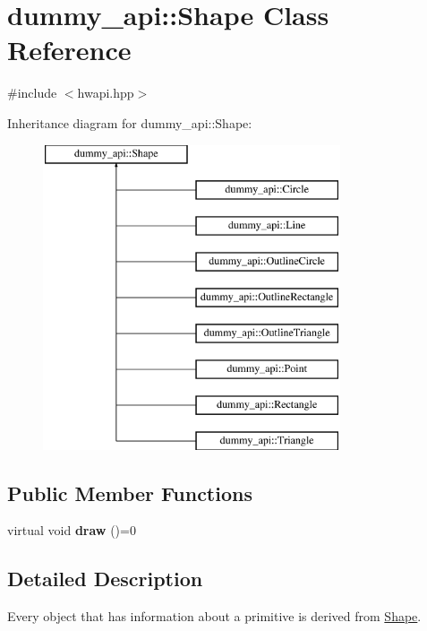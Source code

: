 \hypertarget{classdummy__api_1_1Shape}{}\section{dummy\+\_\+api\+:\+:Shape Class Reference}
\label{classdummy__api_1_1Shape}


{\ttfamily \#include $<$hwapi.\+hpp$>$}

Inheritance diagram for dummy\+\_\+api\+:\+:Shape\+:\begin{figure}[H]
\begin{center}
\leavevmode
\includegraphics[height=9.000000cm]{classdummy__api_1_1Shape}
\end{center}
\end{figure}
\subsection*{Public Member Functions}
\begin{DoxyCompactItemize}
\item 
\mbox{\label{classdummy__api_1_1Shape_a9f357f722f9df3199026cd95b2ef74b8}} 
virtual void {\bfseries draw} ()=0
\end{DoxyCompactItemize}


\subsection{Detailed Description}
Every object that has information about a primitive is derived from \mbox{\hyperlink{classdummy__api_1_1Shape}{Shape}}.

